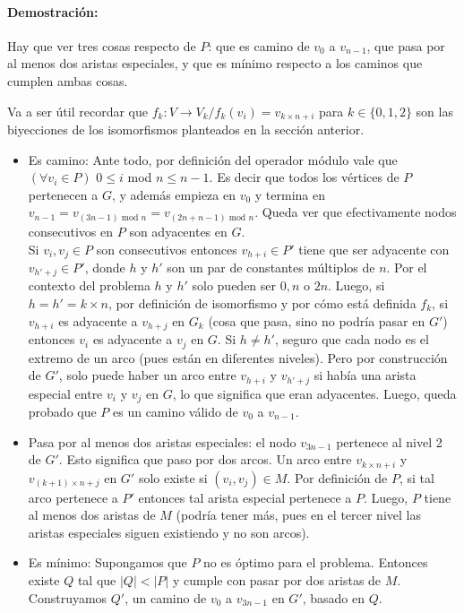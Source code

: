 \paragraph*{Demostración: }

Hay que ver tres cosas respecto de $P$: que es camino de $v_0$ a $v_{n-1}$, que pasa por al menos dos aristas especiales, y que es mínimo respecto a los caminos que cumplen ambas cosas.

Va a ser útil recordar que $f_k:V\rightarrow V_k/ f_k(v_i) = v_{k\times n + i}$ para $k\in \{0,1,2\}$ son las biyecciones de los isomorfismos planteados en la sección anterior.

\begin{itemize}
	\item Es camino: Ante todo, por definición del operador módulo vale que $(\forall v_i\in P)$ $0\leq i$ mod $n\leq n-1$. Es decir que todos los vértices de $P$ pertenecen a $G$, y además empieza en $v_0$ y termina en $v_{n-1} = v_{(3n-1)\text{ mod } n}=v_{(2n+n-1)\text{ mod } n} $. Queda ver que efectivamente nodos consecutivos en $P$ son adyacentes en $G$. \\Si $v_i, v_j\in P$ son consecutivos entonces $v_{h+i}\in P'$ tiene que ser adyacente con $v_{h'+j}\in P'$, donde $h$ y $h'$ son un par de constantes múltiplos de $n$. Por el contexto del problema $h$ y $h'$ solo pueden ser $0, n$ o $2n$. Luego, si $h=h'=k\times n$, por definición de isomorfismo y por cómo está definida $f_k$, si $v_{h+i}$ es adyacente a $v_{h+j}$ en $G_k$ (cosa que pasa, sino no podría pasar en $G'$) entonces $v_i$ es adyacente a $v_j$ en $G$. Si $h\neq h'$, seguro que cada nodo es el extremo de un arco (pues están en diferentes niveles). Pero por construcción de $G'$, solo puede haber un arco entre $v_{h+i}$ y $v_{h'+j}$ si había una arista especial entre $v_i$ y $v_j$ en $G$, lo que significa que eran adyacentes. Luego, queda probado que $P$ es un camino válido de $v_0$ a $v_{n-1}$.
	\item Pasa por al menos dos aristas especiales: el nodo $v_{3n-1}$ pertenece al nivel 2 de $G'$. Esto significa que paso por dos arcos. Un arco entre $v_{k\times n + i}$ y $v_{(k+1)\times n + j}$ en $G'$ solo existe si $(v_i, v_j)\in M$. Por definición de $P$, si tal arco pertenece a $P'$ entonces tal arista especial pertenece a $P$. Luego, $P$ tiene al menos dos aristas de $M$ (podría tener más, pues en el tercer nivel las aristas especiales siguen existiendo y no son arcos).
	\item Es mínimo: Supongamos que $P$ no es óptimo para el problema. Entonces existe $Q$ tal que $|Q| < |P|$ y cumple con pasar por dos aristas de $M$. Construyamos $Q'$, un camino de $v_0$ a $v_{3n-1}$ en $G'$, basado en $Q$.\\

\end{itemize}
